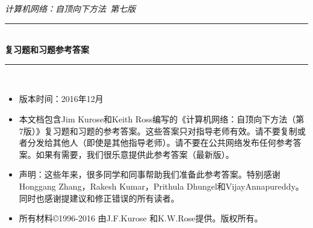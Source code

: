 \documentclass[11pt,UTF8,twoside]{article}
\newcommand{\HRule}{\rule{\linewidth}{0.5mm}}
\begin{document}
	\begin{titlepage}
		\begin{center}
			\textit{\LARGE 计算机网络：自顶向下方法\ 第七版 }\\[1.5cm]
			\HRule \\[0.4cm]
			{ \huge \bfseries 复习题和习题参考答案\\[0.4cm] }
			\HRule \\[1.5cm]
		\end{center}
        \begin{itemize}
        \item {版本时间：2016年12月}
        
        \item 本文档包含Jim Kurose和Keith Ross编写的《计算机网络：自顶向下方法（第7版）》复习题和习题的参考答案。这些答案只对指导老师有效。请不要复制或者分发给其他人（即使是其他指导老师）。请不要在公共网络发布任何参考答案。如果有需要，我们很乐意提供此参考答案（最新版）。
        
        \item 声明：这些年来，很多同学和同事帮助我们准备此参考答案。特别感谢Honggang Zhang，Rakesh Kumar，Prithula Dhungel和VijayAnnapureddy。同时也感谢提建议和修正错误的所有读者。
        
        \item 所有材料©1996-2016 由J.F.Kurose 和K.W.Rose提供。版权所有。
    \end{itemize}
	\end{titlepage}

	{\tableofcontents}
	\newpage
	\pagestyle{fancy}
	\fancyhf{}  %
	\pagestyle{fancy}
	\fancyfoot[C]{\thepage $\slash$ \pageref{LastPage}}
\end{document}
